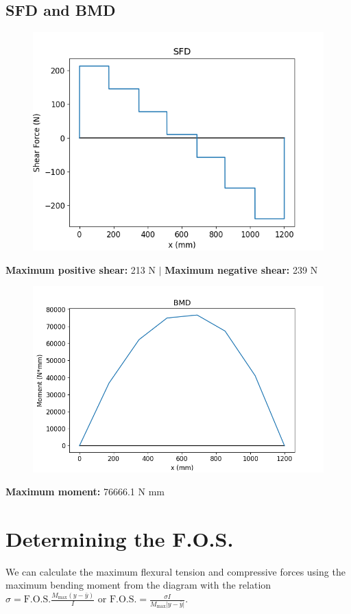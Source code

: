 \documentclass[11pt]{article}
\begin{document}
\subsection{SFD and BMD}
\begin{figure}[H]
\centering
\includegraphics[scale=0.7]{SFDv2.png} 
\end{figure}
\textbf{Maximum positive shear:} 213 N $|$ \textbf{Maximum negative shear:} 239 N 
\begin{figure}[H]
\centering
\includegraphics[scale=0.7]{BMDv2.png} 
\end{figure}
\textbf{Maximum moment:} 76666.1 N mm
\section{Determining the F.O.S.}
We can calculate the maximum flexural tension and compressive forces using the maximum bending moment from the diagram with the relation $\sigma = \text{F.O.S.} \frac{M_{\text{max}}(y-\bar{y})}{I}$ or  $\text{F.O.S.} = \frac{\sigma I}{M_{\text{max}}|y-\bar{y}|}$.
\end{document}
